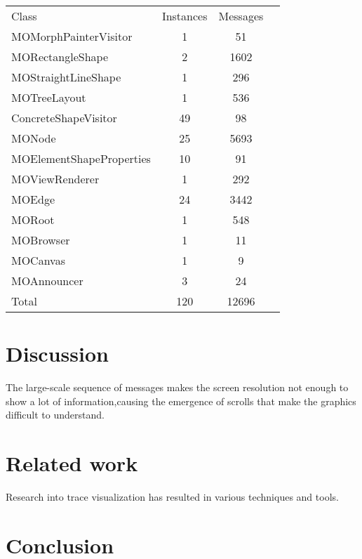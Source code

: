 \documentclass{sig-alternate}
\newcommand{\seclabel}[1]{\label{sec:#1}}
\begin{document}
\begin{center}
   \begin{tabular}{|l||ccr|} \hline
	Class & Instances & Messages \\
	MOMorphPainterVisitor & 1 & 51	\\
	MORectangleShape & 2 & 1602	\\
	MOStraightLineShape & 1 & 296	\\
	MOTreeLayout & 1 & 536	\\
	ConcreteShapeVisitor & 49 & 98 \\
	MONode & 25 & 5693\\
	MOElementShapeProperties & 10 & 91\\
	MOViewRenderer & 1 & 292\\
	MOEdge & 24 & 3442\\
	MORoot & 1 & 548\\
	MOBrowser & 1 & 11\\
	MOCanvas & 1 & 9\\
	MOAnnouncer & 3 & 24\\
	Total & 120 & 12696 \\
   \end{tabular}
\end{center}

\section{Discussion}\seclabel{discussion}

The large-scale sequence of messages makes the screen resolution not enough to show a lot of information,causing the emergence of scrolls that make the graphics difficult to understand. 



\section{Related work}\seclabel{relatedwork}

Research into trace visualization has resulted in various techniques and tools.

\section{Conclusion}\seclabel{conclusion}




\end{document}
